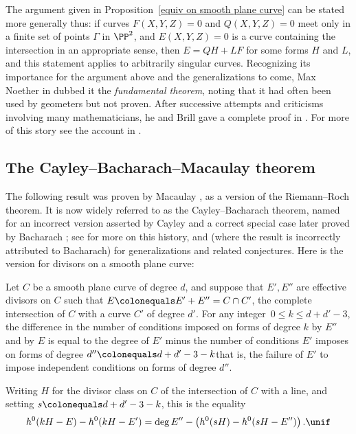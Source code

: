 The argument given in Proposition~\ref{equiv on smooth plane curve} can be stated more generally thus:  if curves $F(X,Y,Z)=0$ and $Q(X,Y,Z)=0$
meet only in a finite set of points $\Gamma$ in $\PP^{2}$, and $E(X,Y,Z) = 0$ is a curve containing the intersection in an appropriate sense,
then $E = QH +LF$ for some forms $H$ and $L$, and this statement
applies to arbitrarily singular curves. Recognizing its importance for
the argument above and the generalizations to come, Max Noether
%
in \cite{Noether1873} dubbed it the \emph{fundamental theorem},
%
noting that it had often been used by geometers but not proven. After successive attempts and
%
criticisms involving many mathematicians, he and Brill gave a complete
proof in \cite{Brill-NoetherOriginal}. For more of this story see the
account in \cite{eisenbud-gray}.

\subsection{The Cayley--Bacharach--Macaulay theorem}\label{CB section}

The following result was proven by Macaulay \cite[p.~424]{Macaulay1900}, as a version of the Riemann--Roch theorem. It is now widely referred to as the Cayley--Bacharach theorem, named for an
%
%
incorrect version asserted by Cayley and a correct special case later proved by
Bacharach \citeyear{Bacharach1886}; see 
\cite[Section 2.3]{eisenbud-gray} for more on this history, and
\cite{MR1376653} (where the result is incorrectly attributed to Bacharach) for generalizations and related conjectures. Here is the version for divisors on a smooth plane curve:

\begin{theorem}\label{CBM} Let $C$ be a smooth plane curve of degree $d$, and suppose that
$E', E''$ are effective divisors on $C$ such that $E\colonequals E'+E'' = C\cap C'$, the complete intersection of $C$
with a curve $C'$ of degree $d'$. For any integer
$\,0\leq k \leq d+d'-3$, the difference in the number of conditions imposed
on forms of degree $k$ by $E''$ and by $E$ is equal to the degree of $E'$ minus the
number of conditions $E'$ imposes on forms of degree
$d''\colonequals d+d'-3 -k$\emdash that is, the failure of
$E'$ to impose
independent conditions
%
on forms of degree $d''$.

 Writing $H$ for
the divisor class on $C$ of the intersection of $C$ with a line, and setting $s \colonequals d+d'-3-k$, this is the equality
$$
h^0(kH-E) - h^0(kH-E')  = \deg E'' - \left(h^0(sH) -  h^0(sH-E'')\right)
.
\unif
$$
\end{theorem}

